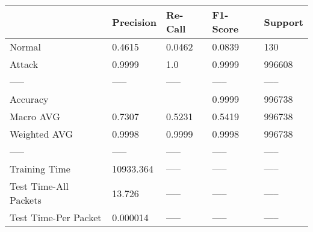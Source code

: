 \begin{tabular}{lllll}
\toprule
{} &  Precision & Re-Call & F1-Score & Support \\
\midrule
Normal                &     0.4615 &  0.0462 &   0.0839 &     130 \\
Attack                &     0.9999 &     1.0 &   0.9999 &  996608 \\
-----                 &      ----- &   ----- &    ----- &   ----- \\
Accuracy              &            &         &   0.9999 &  996738 \\
Macro AVG             &     0.7307 &  0.5231 &   0.5419 &  996738 \\
Weighted AVG          &     0.9998 &  0.9999 &   0.9998 &  996738 \\
-----                 &      ----- &   ----- &    ----- &   ----- \\
Training Time         &  10933.364 &   ----- &    ----- &   ----- \\
Test Time-All Packets &     13.726 &   ----- &    ----- &   ----- \\
Test Time-Per Packet  &   0.000014 &   ----- &    ----- &   ----- \\
\bottomrule
\end{tabular}
